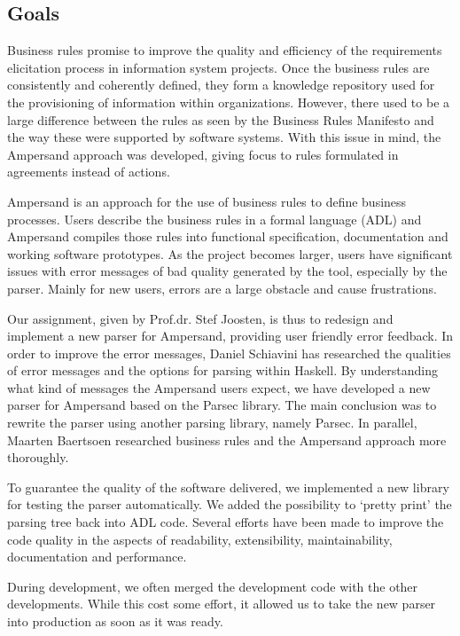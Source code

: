 
\subsection{Goals}
Business rules promise to improve the quality and efficiency of the requirements elicitation process in information system projects.
Once the business rules are consistently and coherently defined, they form a knowledge repository used for the provisioning of information within organizations.
However, there used to be a large difference between the rules as seen by the Business Rules Manifesto and the way these were supported by software systems.
With this issue in mind, the Ampersand approach was developed, giving focus to rules formulated in agreements instead of actions.

Ampersand is an approach for the use of business rules to define business processes.
Users describe the business rules in a formal language (ADL) and Ampersand compiles those rules into functional specification, documentation and working software prototypes.
As the project becomes larger, users have significant issues with error messages of bad quality generated by the tool, especially by the parser.
Mainly for new users, errors are a large obstacle and cause frustrations.

Our assignment, given by Prof.dr. Stef Joosten, is thus to redesign and implement a new parser for Ampersand, providing user friendly error feedback.
In order to improve the error messages, Daniel Schiavini has researched the qualities of error messages and the options for parsing within Haskell.
By understanding what kind of messages the Ampersand users expect, we have developed a new parser for Ampersand based on the Parsec library.
The main conclusion was to rewrite the parser using another parsing library, namely Parsec.
In parallel, Maarten Baertsoen researched business rules and the Ampersand approach more thoroughly.

To guarantee the quality of the software delivered, we implemented a new library for testing the parser automatically.
We added the possibility to `pretty print' the parsing tree back into ADL code.
Several efforts have been made to improve the code quality in the aspects of readability, extensibility, maintainability, documentation and performance.

During development, we often merged the development code with the other developments.
While this cost some effort, it allowed us to take the new parser into production as soon as it was ready.

